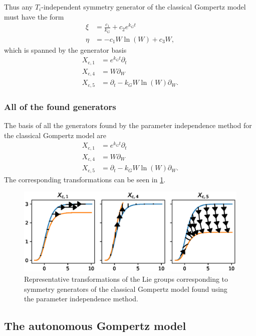 Thus any \(T_i\)-independent symmetry generator of the classical Gompertz model  must have the form
\begin{align*}
  \xi &= \frac{c_1}{k_G} + c_2 e^{k_G t} \\
  \eta &= -c_1 W \ln(W) + c_3 W,
\end{align*}
which is spanned by the generator basis
\begin{align*}
  X_{\text{c},1} &= e^{k_G t} \partial_t \\
  X_{\text{c},4} &= W \partial_W \\
  X_{\text{c},5} &= \partial_t - k_G W \ln(W) \partial_W.
\end{align*}

\subsubsection{All of the found generators}
The basis of all the generators found by the parameter independence method for the classical Gompertz model are
\begin{align*}
  X_{\text{c},1} &= e^{k_G t} \partial_t \\
  X_{\text{c},4} &= W \partial_W \\
  X_{\text{c},5} &= \partial_t - k_G W \ln(W) \partial_W.
\end{align*}
The corresponding transformations can be seen in \cref{fig:gompertz-classical-param}.
\begin{figure}
  \centering
  \includegraphics[width=.96\textwidth]{images/gompertz-classical-param}
  \caption{Representative transformations of the Lie groups corresponding to symmetry generators of the classical Gompertz model found using the parameter independence method.}
  \label{fig:gompertz-classical-param}
\end{figure}


\subsection{The autonomous Gompertz model}

